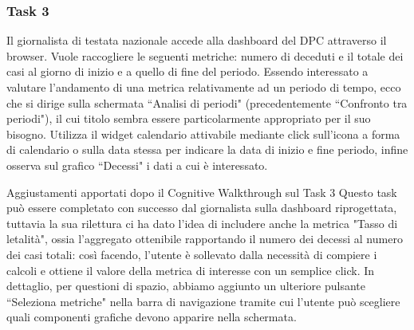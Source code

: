 \subsubsection{Task 3}
\label{sss:cw-task-3}

Il giornalista di testata nazionale accede alla dashboard del DPC attraverso il browser.
Vuole raccogliere le seguenti metriche: numero di deceduti e il totale dei casi al giorno di inizio e a quello di fine del periodo.
Essendo interessato a valutare l'andamento di una metrica relativamente ad un periodo di tempo, ecco che si dirige sulla schermata ``Analisi di periodi" (precedentemente ``Confronto tra periodi"), il cui titolo sembra essere particolarmente appropriato per il suo bisogno.
Utilizza il widget calendario attivabile mediante click sull'icona a forma di calendario o sulla data stessa per indicare la data di inizio e fine periodo, infine osserva sul grafico ``Decessi" i dati a cui è interessato.

\begin{bclogo}{Aggiustamenti apportati dopo il Cognitive Walkthrough sul Task 3}
    Questo task può essere completato con successo dal giornalista sulla dashboard riprogettata, tuttavia la sua rilettura ci ha dato l'idea di includere anche la metrica "Tasso di letalità", ossia l'aggregato ottenibile rapportando il numero dei decessi al numero dei casi totali: così facendo, l'utente è sollevato dalla necessità di compiere i calcoli e ottiene il valore della metrica di interesse con un semplice click.
    In dettaglio, per questioni di spazio, abbiamo aggiunto un ulteriore pulsante ``Seleziona metriche" nella barra di navigazione tramite cui l'utente può scegliere quali componenti grafiche devono apparire nella schermata.
\end{bclogo}